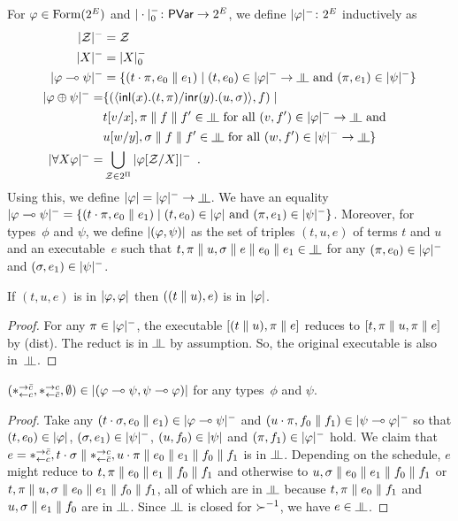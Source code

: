 For $\varphi\in\mathop{\text{Form}}(2^E)$ and $|\cdot|^-_0\colon\mathsf{PVar}\rightarrow 2^E$,
we define $|{\varphi}|^-\colon
2^E$ inductively as
\begin{align*}
 \nsem{\mathcal Z} &= \mathcal Z \\
 \nsem{X}&= |X|_0^- \\
 \nsem{\phi\limp\psi}&=
 \{(t\cdot\pi, e_0\conc e_1)\mid
 (t,e_0)\in\nsem\phi\rightarrow\bbot \text{ and }(\pi,e_1)\in\nsem\psi\}\\
 \nsem{\phi\oplus\psi}=& \{(\mats x{t}{\pi}y{u}{\sigma}, f)\mid\\ &
 t[v/x],\pi\conc f\conc f'\in\bbot \text{ for all } (v,f')\in\nsem{\phi}\rightarrow\bbot\text{
 and }\\ &
 u[w/y],\sigma\conc f\conc f'\in\bbot \text{ for all } (w,f')\in\nsem{\psi}\rightarrow\bbot\}
 \\
 \nsem{\forall X\phi}=&
 \bigcup_{\mathcal Z\in 2^\Pi} \nsem{\phi[\mathcal Z/X]}\enspace.
\end{align*}
Using this, we define $\sem \phi=\nsem{\phi}\rightarrow\bbot$.
We have an equality
$|{\varphi\multimap\psi}|^- = \{(t\cdot\pi, e_0\parallel e_1)\mid
(t,e_0)\in|{\varphi}|\text{ and }(\pi,e_1)\in|{\psi}|^-\}$.
Moreover, for types~$\phi$ and $\psi$, we define $|{(\varphi,\psi)}|$
as the set of triples $(t,u,e)$ of terms $t$ and $u$ and an executable~$e$
such
that
$t,\pi\conc u,\sigma\conc e\conc e_0\conc e_1
\in\bbot$ for any $(\pi,e_0)\in|{\varphi}|^-$
and $(\sigma,e_1)\in|{\psi}|^-$.

\begin{proposition}
 \label{squash}
 If $(t,u,e)$ is in $|{\varphi,\varphi}|$ then $((t\parallel u), e)$ is in
 $|{\varphi}|$.
\end{proposition}
\begin{proof}
 For any $\pi\in|{\varphi}|^-$,
 the executable $[(t\parallel u),\pi\parallel e]$ reduces to $[t,\pi\parallel
 u,\pi\parallel e]$ by (dist).
 The reduct is in $\bbot$ by assumption.
 So, the original executable is also in~$\bbot$.
\end{proof}

\begin{proposition}
 \label{comod-type}
 $(\ast^{\rightarrow {\bar{c}}}_{\leftarrow{c}},\ast^{\rightarrow {c}}_{\leftarrow{\bar{c}}},\emptyset)\in|{(\varphi\multimap\psi,\psi\multimap\varphi)}|$
 for any types~$\phi$ and $\psi$.
\end{proposition}
\begin{proof}
 Take any $(t\cdot\sigma,e_{0}\parallel e_{1})\in|{\varphi\multimap\psi}|^-$
 and $(u\cdot\pi,f_{0}\parallel f_{1})\in|{\psi\multimap\varphi}|^-$ so that
 $(t, e_{0})\in|{\varphi}|$, $(\sigma,e_{1})\in|{\psi}|^-$,
 $(u, f_{0})\in|{\psi}|$ and $(\pi,f_{1})\in|{\varphi}|^-$ hold.
 We claim that $e=\ast^{\rightarrow {\bar{c}}}_{\leftarrow{c}},t\cdot\sigma\parallel\ast^{\rightarrow {c}}_{\leftarrow{\bar{c}}},u\cdot\pi\parallel
 e_{0}\parallel e_{1}\parallel f_{0}\parallel f_{1}$ is in
 $\bbot$.
 Depending on the schedule, $e$ might reduce to
 $ t,\pi\parallel e_{0}\parallel e_{1}\parallel f_{0}\parallel f_{1}$ and otherwise to
 $ u,\sigma\parallel e_{0}\parallel e_{1}\parallel f_{0}\parallel f_{1}$ or
 $ t,\pi\parallel u,\sigma\parallel e_{0}\parallel e_{1}\parallel f_{0}\parallel f_{1}$,
 all of which are in $\bbot$ because
 $t,\pi\parallel e_{0}\parallel f_{1}$ and
 $u,\sigma\parallel e_{1}\parallel f_{0}$ are in $\bbot$.
 Since $\bbot$ is closed for $\succ^{-1}$,
 we have $e\in\bbot$.
\end{proof}


